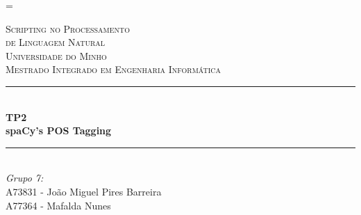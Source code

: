 \documentclass[12pt]{article}
\begin{document}
\sloppy
\LTcapwidth=\textwidth

\begin{titlepage}

\newcommand{\HRule}{\rule{\linewidth}{0.5mm}} %

\center %

\vspace{0.5cm}
 

\textsc{\LARGE Scripting no Processamento}\\[0.3cm]
\textsc{\LARGE de Linguagem Natural}\\[1.1cm] %
\textsc{\Large Universidade do Minho}\\[0.5cm] %
\textsc{\large Mestrado Integrado em Engenharia Informática}\\[0.5cm] %

\vspace{0.8cm}
\HRule \\[0.6cm]
{ \huge \bfseries TP2}\\[0.4cm] %
{ \Large \bfseries spaCy's POS Tagging}\\[0.4cm] %
\HRule \\[1.0cm]
 

\Large \emph{Grupo 7:}\\
A73831 - João Miguel Pires Barreira\\
A77364 - Mafalda Nunes\\[1.3cm]



\end{titlepage}
\end{document}
